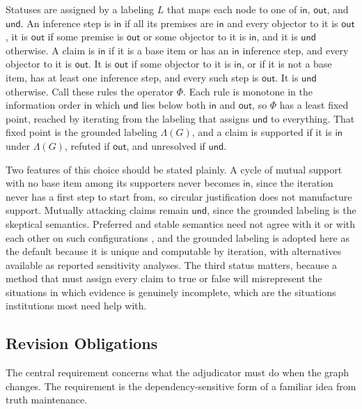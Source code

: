 \documentclass[12pt]{article}
\theoremstyle{definition}
\theoremstyle{remark}
\begin{document}
Statuses are assigned by a labeling $L$ that maps each node to one of $\mathsf{in}$, $\mathsf{out}$, and $\mathsf{und}$. An inference step is $\mathsf{in}$ if all its premises are $\mathsf{in}$ and every objector to it is $\mathsf{out}$, it is $\mathsf{out}$ if some premise is $\mathsf{out}$ or some objector to it is $\mathsf{in}$, and it is $\mathsf{und}$ otherwise. A claim is $\mathsf{in}$ if it is a base item or has an $\mathsf{in}$ inference step, and every objector to it is $\mathsf{out}$. It is $\mathsf{out}$ if some objector to it is $\mathsf{in}$, or if it is not a base item, has at least one inference step, and every such step is $\mathsf{out}$. It is $\mathsf{und}$ otherwise. Call these rules the operator $\Phi$. Each rule is monotone in the information order in which $\mathsf{und}$ lies below both $\mathsf{in}$ and $\mathsf{out}$, so $\Phi$ has a least fixed point, reached by iterating from the labeling that assigns $\mathsf{und}$ to everything. That fixed point is the grounded labeling $\Lambda(G)$, and a claim is supported if it is $\mathsf{in}$ under $\Lambda(G)$, refuted if $\mathsf{out}$, and unresolved if $\mathsf{und}$.

Two features of this choice should be stated plainly. A cycle of mutual support with no base item among its supporters never becomes $\mathsf{in}$, since the iteration never has a first step to start from, so circular justification does not manufacture support. Mutually attacking claims remain $\mathsf{und}$, since the grounded labeling is the skeptical semantics. Preferred and stable semantics need not agree with it or with each other on such configurations \cite{dung1995}, and the grounded labeling is adopted here as the default because it is unique and computable by iteration, with alternatives available as reported sensitivity analyses. The third status matters, because a method that must assign every claim to true or false will misrepresent the situations in which evidence is genuinely incomplete, which are the situations institutions most need help with.

\subsection{Revision Obligations}

The central requirement concerns what the adjudicator must do when the graph changes. The requirement is the dependency-sensitive form of a familiar idea from truth maintenance.
\end{document}

